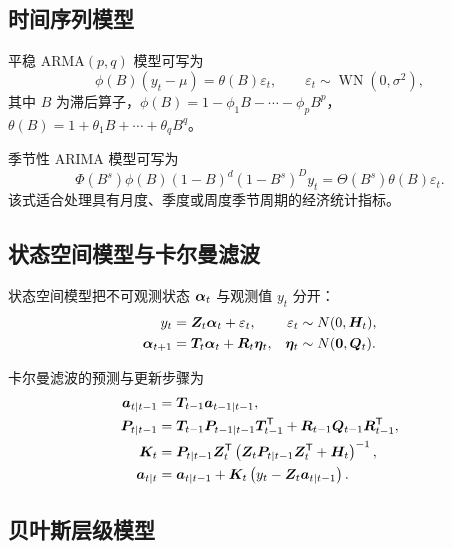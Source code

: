 \subsection{时间序列模型}

平稳 ARMA\((p,q)\) 模型可写为
\begin{equation}
  \phi(B)(y_t-\mu)=\theta(B)\varepsilon_t,\qquad
  \varepsilon_t\sim \operatorname{WN}(0,\sigma^2),
\end{equation}
其中 \(B\) 为滞后算子，\(\phi(B)=1-\phi_1B-\cdots-\phi_pB^p\)，\(\theta(B)=1+\theta_1B+\cdots+\theta_qB^q\)。

季节性 ARIMA 模型可写为
\begin{equation}
  \Phi(B^s)\phi(B)(1-B)^d(1-B^s)^D y_t
  =\Theta(B^s)\theta(B)\varepsilon_t.
  \label{eq:sarima}
\end{equation}
该式适合处理具有月度、季度或周度季节周期的经济统计指标。

\subsection{状态空间模型与卡尔曼滤波}

状态空间模型把不可观测状态 \(\bm{\alpha}_t\) 与观测值 \(y_t\) 分开：
\begin{align}
  y_t &= \bm{Z}_t\bm{\alpha}_t+\varepsilon_t,
  &\varepsilon_t&\sim N(0,\bm{H}_t),\\
  \bm{\alpha}_{t+1} &= \bm{T}_t\bm{\alpha}_t+\bm{R}_t\bm{\eta}_t,
  &\bm{\eta}_t&\sim N(\bm{0},\bm{Q}_t).
\end{align}

卡尔曼滤波的预测与更新步骤为
\begin{align}
  \bm{a}_{t\mid t-1} &= \bm{T}_{t-1}\bm{a}_{t-1\mid t-1},\\
  \bm{P}_{t\mid t-1} &= \bm{T}_{t-1}\bm{P}_{t-1\mid t-1}\bm{T}_{t-1}^{\mathsf T}
  +\bm{R}_{t-1}\bm{Q}_{t-1}\bm{R}_{t-1}^{\mathsf T},\\
  \bm{K}_t &= \bm{P}_{t\mid t-1}\bm{Z}_t^{\mathsf T}
  \left(\bm{Z}_t\bm{P}_{t\mid t-1}\bm{Z}_t^{\mathsf T}+\bm{H}_t\right)^{-1},\\
  \bm{a}_{t\mid t} &= \bm{a}_{t\mid t-1}
  +\bm{K}_t\left(y_t-\bm{Z}_t\bm{a}_{t\mid t-1}\right).
\end{align}

\subsection{贝叶斯层级模型}

